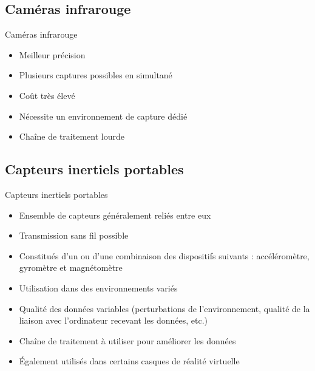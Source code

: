     \subsection{Caméras infrarouge}
    \begin{frame}{\subsecname}
        \begin{block}{Caméras infrarouge}
            \begin{itemize}[label=$\bullet$]
                \item Meilleur précision
                \item Plusieurs captures possibles en simultané 
                \item Coût très élevé
                \item Nécessite un environnement de capture dédié
                \item Chaîne de traitement lourde
            \end{itemize}
        \end{block}
    \end{frame}
    
    \subsection{Capteurs inertiels portables}
    \begin{frame}{\subsecname}
        \begin{block}{Capteurs inertiels portables}
            \begin{itemize}[label=$\bullet$]
                \item Ensemble de capteurs généralement reliés entre eux
                \item Transmission sans fil possible 
                \item Constitués d'un ou d'une combinaison des dispositifs suivants : accéléromètre, gyromètre et magnétomètre
                \item Utilisation dans des environnements variés
                \item Qualité des données variables (perturbations de l'environnement, qualité de la liaison avec l'ordinateur recevant les données, etc.)
                \item Chaîne de traitement à utiliser pour améliorer les données 
                \item Également utilisés dans certains casques de réalité virtuelle 
            \end{itemize}
        \end{block}
    \end{frame}
    
